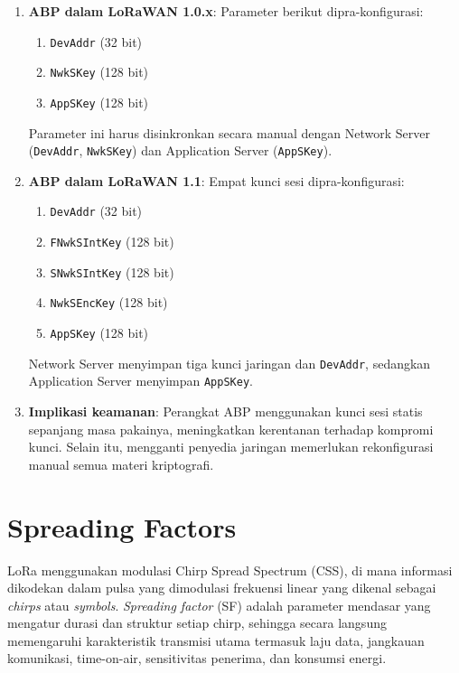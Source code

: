 \begin{enumerate}
    \item \textbf{ABP dalam LoRaWAN 1.0.x}: Parameter berikut dipra-konfigurasi:
          \begin{enumerate}
              \item \texttt{DevAddr} (32 bit)
              \item \texttt{NwkSKey} (128 bit)
              \item \texttt{AppSKey} (128 bit)
          \end{enumerate}
          Parameter ini harus disinkronkan secara manual dengan Network Server (\texttt{DevAddr}, \texttt{NwkSKey}) dan Application Server (\texttt{AppSKey}).
    \item \textbf{ABP dalam LoRaWAN 1.1}: Empat kunci sesi dipra-konfigurasi:
          \begin{enumerate}
              \item \texttt{DevAddr} (32 bit)
              \item \texttt{FNwkSIntKey} (128 bit)
              \item \texttt{SNwkSIntKey} (128 bit)
              \item \texttt{NwkSEncKey} (128 bit)
              \item \texttt{AppSKey} (128 bit)
          \end{enumerate}
          Network Server menyimpan tiga kunci jaringan dan \texttt{DevAddr}, sedangkan Application Server menyimpan \texttt{AppSKey}.
    \item \textbf{Implikasi keamanan}: Perangkat ABP menggunakan kunci sesi statis sepanjang masa pakainya, meningkatkan kerentanan terhadap kompromi kunci. Selain itu, mengganti penyedia jaringan memerlukan rekonfigurasi manual semua materi kriptografi.
\end{enumerate}
\section{Spreading Factors}
LoRa menggunakan modulasi Chirp Spread Spectrum (CSS), di mana informasi dikodekan dalam pulsa yang dimodulasi frekuensi linear yang dikenal sebagai \emph{chirps} atau \emph{symbols}. \emph{Spreading factor} (SF) adalah parameter mendasar yang mengatur durasi dan struktur setiap chirp, sehingga secara langsung memengaruhi karakteristik transmisi utama termasuk laju data, jangkauan komunikasi, time-on-air, sensitivitas penerima, dan konsumsi energi.
